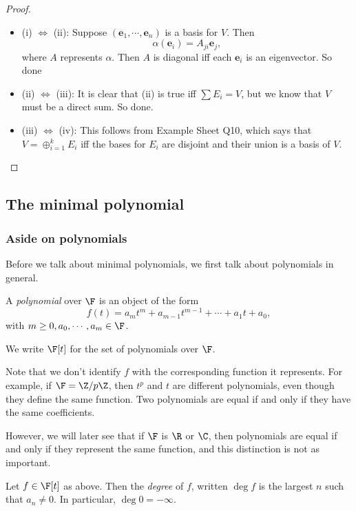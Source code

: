 \documentclass[a4paper]{article}
\begin{document}
\begin{proof}\leavevmode
  \begin{itemize}
    \item (i) $\Leftrightarrow$ (ii): Suppose $(\mathbf{e}_1, \cdots, \mathbf{e}_n)$ is a basis for $V$. Then
      \[
        \alpha(\mathbf{e}_i) = A_{ji} \mathbf{e}_j,
      \]
      where $A$ represents $\alpha$. Then $A$ is diagonal iff each $\mathbf{e}_i$ is an eigenvector. So done
    \item (ii) $\Leftrightarrow$ (iii): It is clear that (ii) is true iff $\sum E_i = V$, but we know that $V$ must be a direct sum. So done.
    \item (iii) $\Leftrightarrow$ (iv): This follows from Example Sheet Q10, which says that $V = \oplus_{i = 1}^k E_i$ iff the bases for $E_i$ are disjoint and their union is a basis of $V$.
  \end{itemize}
\end{proof}
\subsection{The minimal polynomial}
\subsubsection{Aside on polynomials}
Before we talk about minimal polynomials, we first talk about polynomials in general.

\begin{defi}[Polynomial]
  A \emph{polynomial} over $\F$ is an object of the form
  \[
    f(t) = a_m t^m + a_{m - 1}t^{m - 1} + \cdots + a_1 t + a_0,
  \]
  with $m \geq 0, a_0, \cdots, a_m \in \F$.

  We write $\F[t]$ for the set of polynomials over $\F$.
\end{defi}
Note that we don't identify $f$ with the corresponding function it represents. For example, if $\F = \Z/p\Z$, then $t^p$ and $t$ are different polynomials, even though they define the same function. Two polynomials are equal if and only if they have the same coefficients.

However, we will later see that if $\F$ is $\R$ or $\C$, then polynomials are equal if and only if they represent the same function, and this distinction is not as important.

\begin{defi}[Degree]
  Let $f \in \F[t]$ as above. Then the \emph{degree} of $f$, written $\deg f$ is the largest $n$ such that $a_n \not= 0$. In particular, $\deg 0 = -\infty$.
\end{defi}
\end{document}

